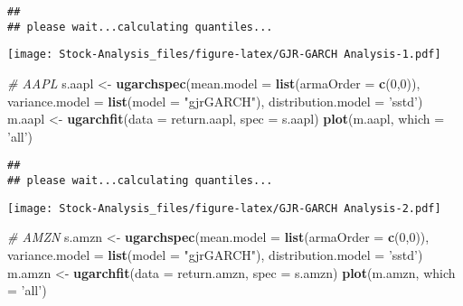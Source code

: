 \documentclass[
]{article}
\newenvironment{Shaded}{\begin{snugshade}}{\end{snugshade}}
\newcommand{\CommentTok}[1]{\textcolor[rgb]{0.56,0.35,0.01}{\textit{#1}}}
\newcommand{\DataTypeTok}[1]{\textcolor[rgb]{0.13,0.29,0.53}{#1}}
\newcommand{\DecValTok}[1]{\textcolor[rgb]{0.00,0.00,0.81}{#1}}
\newcommand{\KeywordTok}[1]{\textcolor[rgb]{0.13,0.29,0.53}{\textbf{#1}}}
\newcommand{\NormalTok}[1]{#1}
\newcommand{\StringTok}[1]{\textcolor[rgb]{0.31,0.60,0.02}{#1}}
\begin{document}
\begin{verbatim}
## 
## please wait...calculating quantiles...
\end{verbatim}

\texttt{[image: Stock-Analysis\_files/figure-latex/GJR-GARCH Analysis-1.pdf]}

\begin{Shaded}
\begin{Highlighting}[]
\CommentTok{# AAPL}
\NormalTok{s.aapl <-}\StringTok{ }\KeywordTok{ugarchspec}\NormalTok{(}\DataTypeTok{mean.model =} \KeywordTok{list}\NormalTok{(}\DataTypeTok{armaOrder =} \KeywordTok{c}\NormalTok{(}\DecValTok{0}\NormalTok{,}\DecValTok{0}\NormalTok{)),}
                \DataTypeTok{variance.model =} \KeywordTok{list}\NormalTok{(}\DataTypeTok{model =} \StringTok{"gjrGARCH"}\NormalTok{),}
                \DataTypeTok{distribution.model =} \StringTok{'sstd'}\NormalTok{)}
\NormalTok{m.aapl <-}\StringTok{ }\KeywordTok{ugarchfit}\NormalTok{(}\DataTypeTok{data =}\NormalTok{ return.aapl, }\DataTypeTok{spec =}\NormalTok{ s.aapl)}
\KeywordTok{plot}\NormalTok{(m.aapl, }\DataTypeTok{which =} \StringTok{'all'}\NormalTok{)}
\end{Highlighting}
\end{Shaded}

\begin{verbatim}
## 
## please wait...calculating quantiles...
\end{verbatim}

\texttt{[image: Stock-Analysis\_files/figure-latex/GJR-GARCH Analysis-2.pdf]}

\begin{Shaded}
\begin{Highlighting}[]
\CommentTok{# AMZN}
\NormalTok{s.amzn <-}\StringTok{ }\KeywordTok{ugarchspec}\NormalTok{(}\DataTypeTok{mean.model =} \KeywordTok{list}\NormalTok{(}\DataTypeTok{armaOrder =} \KeywordTok{c}\NormalTok{(}\DecValTok{0}\NormalTok{,}\DecValTok{0}\NormalTok{)),}
                \DataTypeTok{variance.model =} \KeywordTok{list}\NormalTok{(}\DataTypeTok{model =} \StringTok{"gjrGARCH"}\NormalTok{),}
                \DataTypeTok{distribution.model =} \StringTok{'sstd'}\NormalTok{)}
\NormalTok{m.amzn <-}\StringTok{ }\KeywordTok{ugarchfit}\NormalTok{(}\DataTypeTok{data =}\NormalTok{ return.amzn, }\DataTypeTok{spec =}\NormalTok{ s.amzn)}
\KeywordTok{plot}\NormalTok{(m.amzn, }\DataTypeTok{which =} \StringTok{'all'}\NormalTok{)}
\end{Highlighting}
\end{Shaded}
\end{document}
